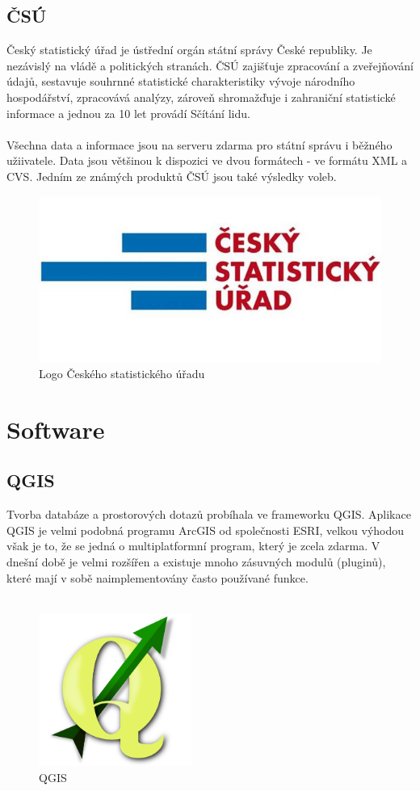 \documentclass[a4paper, 12pt]{article}
\begin{document}
\subsection{ČSÚ}
Český statistický úřad je ústřední orgán státní správy České republiky. Je nezávislý na vládě a politických stranách. ČSÚ zajišťuje zpracování a zveřejňování údajů, sestavuje souhrnné statistické charakteristiky vývoje národního hospodářství, zpracovává analýzy, zároveň shromažďuje i zahraniční statistické informace a jednou za 10 let provádí Sčítání lidu. \\
\\
Všechna data a informace jsou na serveru zdarma pro státní správu i běžného užiivatele. Data jsou většinou k dispozici ve dvou formátech - ve formátu XML a CVS. Jedním ze známých produktů ČSÚ jsou také výsledky voleb.

\begin{figure}[h!]
	\centering
	\includegraphics[width=12cm]{pictures/csu.jpg}
	\caption{Logo Českého statistického úřadu}
\end{figure}


\section{Software}
\subsection{QGIS}
Tvorba databáze a prostorových dotazů probíhala ve frameworku QGIS. Aplikace QGIS je velmi podobná programu ArcGIS od společnosti ESRI, velkou výhodou však je to, že se jedná o multiplatformní program, který je zcela zdarma. V dnešní době je velmi rozšířen a existuje mnoho zásuvných modulů (pluginů), které mají v sobě naimplementovány často používané funkce.\\
\\

\begin{figure}[h!]
	\centering
	\includegraphics[width=5cm]{pictures/qgis.png}
	\caption{QGIS}
\end{figure}
\end{document}
